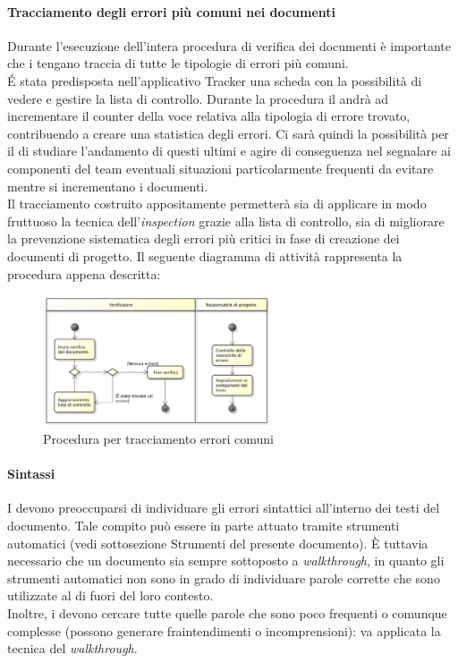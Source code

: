 			\paragraph{Tracciamento degli errori più comuni nei documenti}
				Durante l'esecuzione dell'intera procedura di verifica dei documenti è importante che i  tengano traccia di tutte le tipologie di errori più comuni. \\
			É stata predisposta nell'applicativo Tracker una scheda con la possibilità di vedere e gestire la lista di controllo. Durante la procedura il  andrà ad incrementare il counter della voce relativa alla tipologia di errore trovato, contribuendo a creare una statistica degli errori. Ci sarà quindi la possibilità per il  di studiare l'andamento di questi ultimi e agire di conseguenza nel segnalare ai componenti del team eventuali situazioni particolarmente frequenti da evitare mentre si incrementano i documenti.\\
			Il tracciamento costruito appositamente permetterà sia di applicare in modo fruttuoso la tecnica dell'\textit{inspection} grazie alla lista di controllo, sia di migliorare la prevenzione sistematica degli errori più critici in fase di creazione dei documenti di progetto.
			Il seguente diagramma di attività rappresenta la procedura appena descritta:
				\begin{figure}[H]
					\centering
					\includegraphics[width=0.6\textwidth]{NormeDiProgetto/Pics/ProceduraDecrementoErrori.pdf}
					\caption{Procedura per tracciamento errori comuni}
				\end{figure}
			\paragraph{Sintassi}
				I  devono preoccuparsi di individuare gli errori sintattici all'interno dei testi del documento. Tale compito può essere in parte attuato tramite strumenti automatici (vedi sottosezione Strumenti del presente documento). È tuttavia necessario che un documento sia sempre sottoposto a \textit{walkthrough}, in quanto gli strumenti automatici non sono in grado di individuare parole corrette che sono utilizzate al di fuori del loro contesto.\\
				Inoltre, i  devono cercare tutte quelle parole che sono poco frequenti o comunque complesse (possono generare fraintendimenti o incomprensioni): va applicata la tecnica del \textit{walkthrough}.
